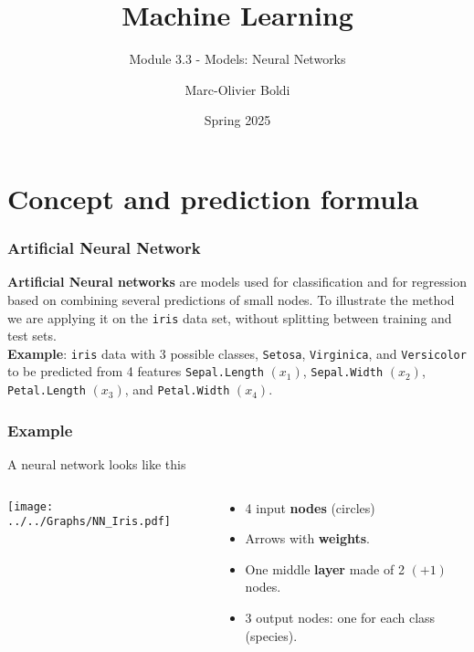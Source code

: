 
\title{Machine Learning}
\subtitle{Module 3.3 - Models: Neural Networks}
\author[MOB]{Marc-Olivier Boldi}
\date{Spring 2025}

	\begin{frame}
	\titlepage
	\end{frame}
\section{Concept and prediction formula}
\begin{frame}
\frametitle{Artificial Neural Network}
{\bf Artificial Neural networks} are models used for classification and for regression based on combining several predictions of small nodes. To illustrate the method we are applying it on the {\tt iris} data set, without splitting between training and test sets. \\ 
\vspace{0.3cm}
{\bf Example}: {\tt iris} data with 3 possible classes, {\tt Setosa}, {\tt Virginica}, and {\tt Versicolor} to be predicted from 4 features {\tt Sepal.Length} $(x_1)$, {\tt Sepal.Width} $(x_2)$, {\tt Petal.Length} $(x_3)$, and {\tt Petal.Width} $(x_4)$. 
\end{frame}
\begin{frame}
\frametitle{Example}
A neural network looks like this
\begin{columns}
\begin{column}{0.6\linewidth}
\texttt{[image: ../../Graphs/NN\_Iris.pdf]}
\end{column}
\begin{column}{0.4\linewidth}
\begin{itemize}
\item 4 input {\bf nodes} (circles) 
\item Arrows with {\bf weights}.
\item One middle {\bf layer} made of 2 $(+1)$ nodes.
\item 3 output nodes: one for each class (species).
\end{itemize}
\end{column}
\end{columns}
\end{frame}
